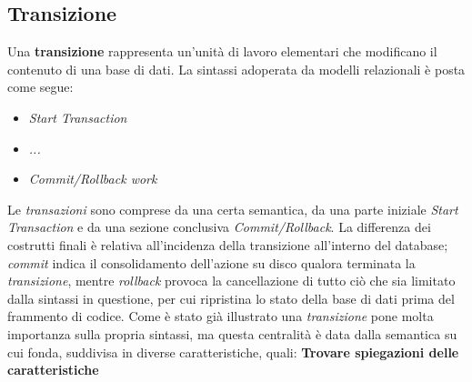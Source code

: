 \documentclass{article}
\begin{document}
\subsection*{Transizione}
\large
Una \textbf{transizione} rappresenta un'unità di lavoro elementari che modificano il contenuto di una base di dati. La sintassi adoperata da modelli relazionali è posta come segue:
\begin{itemize}[label={ }, leftmargin=1cm]
    \itemsep0em
    \item \textit{Start Transaction}
    \item \textit{...}
    \item \textit{Commit/Rollback work}
\end{itemize}
Le \textit{transazioni} sono comprese da una certa semantica, da una parte iniziale \textit{Start Transaction} e da una sezione conclusiva \textit{Commit/Rollback}. La differenza dei costrutti finali è relativa all'incidenza della transizione all'interno del database; \textit{commit} indica il consolidamento dell'azione su disco qualora terminata la \textit{transizione}, mentre \textit{rollback} provoca la cancellazione di tutto ciò che sia limitato dalla sintassi in questione, per cui ripristina lo stato della base di dati prima del frammento di codice.
Come è stato già illustrato una \textit{transizione} pone molta importanza sulla propria sintassi, ma questa centralità è data dalla semantica su cui fonda, suddivisa in diverse caratteristiche, quali: \textbf{Trovare spiegazioni delle caratteristiche}
\end{document}

